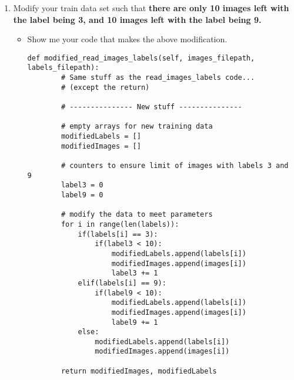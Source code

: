 \documentclass{assignment}
\begin{document}
\begin{problem}
\begin{enumerate}
\begin{enumerate}[label=(\alph*)]

        
        \item Modify your train data set such that \textbf{there are only 10 images left with the label being 3, and 10 images left with the label being 9.}

        \begin{itemize}
            \item Show me your code that makes the above modification.\color{blue}\begin{lstlisting}
def modified_read_images_labels(self, images_filepath, labels_filepath):        
        # Same stuff as the read_images_labels code...
        # (except the return)
        
        # --------------- New stuff ---------------
        
        # empty arrays for new training data
        modifiedLabels = []
        modifiedImages = []
        
        # counters to ensure limit of images with labels 3 and 9
        label3 = 0
        label9 = 0
        
        # modify the data to meet parameters
        for i in range(len(labels)):
            if(labels[i] == 3):
                if(label3 < 10):
                    modifiedLabels.append(labels[i])
                    modifiedImages.append(images[i])
                    label3 += 1
            elif(labels[i] == 9):
                if(label9 < 10):
                    modifiedLabels.append(labels[i])
                    modifiedImages.append(images[i])
                    label9 += 1
            else:
                modifiedLabels.append(labels[i])
                modifiedImages.append(images[i])
        
        return modifiedImages, modifiedLabels
            

\end{lstlisting}
\end{itemize}
\end{enumerate}
\end{enumerate}
\end{problem}
\end{document}
